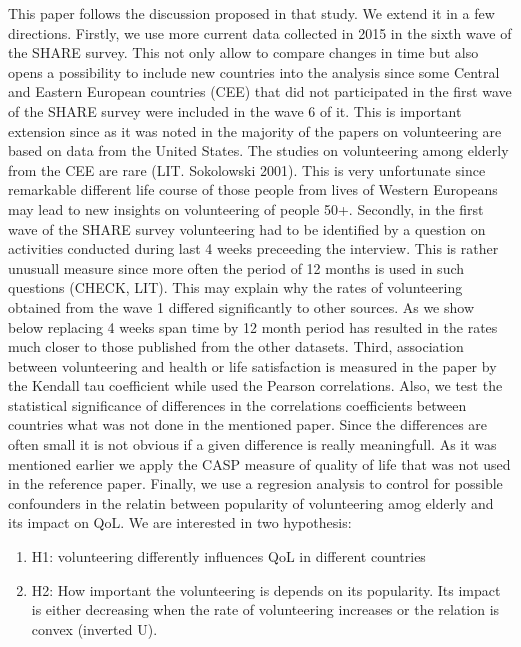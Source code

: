 \documentclass[10pt, letterpaper]{article}
\begin{document}
\begin{spacing}{1.4}
This paper follows the discussion proposed in that study. We extend it in a few directions. Firstly, we use more current data collected in 2015 in the sixth wave of the SHARE survey. This not only allow to compare changes in time but also opens a possibility to include new countries into the analysis since some Central and Eastern European countries (CEE) that did not participated in the first wave of the SHARE survey were included in the wave 6 of it. This is important extension since as it was noted in \citep{casiday08} the majority of the papers on volunteering are based on data from the United States. The studies on volunteering among elderly from the CEE are rare (LIT. Sokolowski 2001). This is very unfortunate since remarkable different life course of those people from lives of Western Europeans may lead to new insights on volunteering of people 50+. Secondly, in the first wave of the SHARE survey volunteering had to be identified by a question on activities conducted during last 4 weeks preceeding the interview. This is rather unusuall measure since more often the period of 12 months is used in such questions (CHECK, LIT). This may explain why the rates of volunteering obtained from the wave 1 differed significantly to other sources. As we show below replacing 4 weeks span time by 12 month period has resulted in the rates much closer to those published from the other datasets. Third, association between volunteering and health or life satisfaction is measured in the paper by the Kendall tau coefficient while \citet{haski09} used the Pearson correlations. Also, we test the statistical significance of differences in the correlations coefficients between countries what was not done in the mentioned paper.  Since the differences are often small it is not obvious if a given difference is really meaningfull. As it was mentioned earlier  we apply the CASP measure of quality of life that was not used in the reference paper. Finally, we use a regresion analysis to control for possible confounders in the relatin between popularity of volunteering amog elderly and its impact on QoL.  We are interested in two hypothesis: \\

\begin{enumerate}
\item H1: volunteering  differently influences QoL in different countries
\item H2: How important the volunteering is depends on its popularity. Its impact is either decreasing when the rate of volunteering increases or the relation is convex (inverted U).
\end{enumerate}


\end{spacing}
\end{document}
